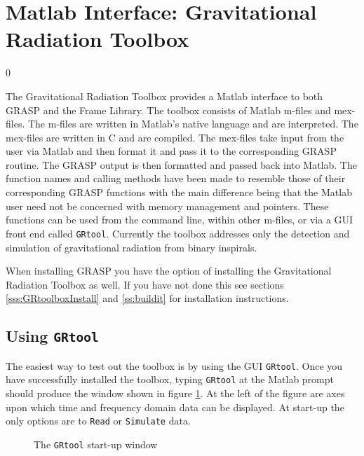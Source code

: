 %

\section{Matlab Interface: Gravitational Radiation Toolbox}
\label{s:GRtoolbox}
\setcounter{equation}0

The Gravitational Radiation Toolbox provides a
Matlab interface to both GRASP and the Frame Library. 
The toolbox consists of Matlab m-files and mex-files. The m-files are written
in Matlab's native language and are interpreted. The mex-files are written in
C and are compiled. The mex-files take input from the user via Matlab and
then format it and pass it to the corresponding GRASP routine. The GRASP
output is then formatted and passed back into Matlab. The function names and
calling methods have been made to resemble those of their corresponding GRASP
functions with the main difference being that the Matlab user need not be
concerned with memory management and pointers. These functions can be used
from the command line, within other m-files, or via a GUI front end called
\texttt{GRtool}. Currently the toolbox addresses only the detection and simulation
of gravitational radiation from binary inspirals.

When installing GRASP you have the option of installing the Gravitational 
Radiation Toolbox as well. If you have not done this see sections 
\ref{sss:GRtoolboxInstall} and \ref{ss:buildit}
for installation instructions.
\clearpage

\subsection{Using {\tt GRtool}}
\label{ss:GRtool}

The easiest way to test out the toolbox is by using the GUI \texttt{GRtool}.
Once you have successfully installed the toolbox, typing \texttt{GRtool} at
the Matlab prompt should produce the window shown in figure \ref{f:startup}. At
the left of the figure are axes upon which time and frequency domain data can
be displayed. At start-up the only options are to \texttt{Read} or
\texttt{Simulate} data.

\begin{figure}[h]
\begin{center}
\caption{ \label{f:startup}
The \texttt{GRtool} start-up window}
\end{center}
\end{figure}

